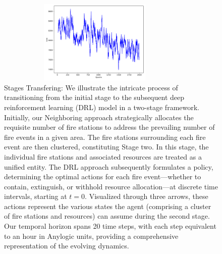 \documentclass[lettersize,journal]{IEEEtran}
\begin{document}
  

    \begin{figure}[H]
      \centering
      \includegraphics[height=4cm,width=9.5cm]{figs/manager_critic_loss.png}
      \caption{Stages Transfering: We illustrate the intricate process of transitioning from the initial stage to the subsequent deep reinforcement learning (DRL) model in a two-stage framework. Initially, our Neighboring approach strategically allocates the requisite number of fire stations to address the prevailing number of fire events in a given area. The fire stations surrounding each fire event are then clustered, constituting Stage two. In this stage, the individual fire stations and associated resources are treated as a unified entity. The DRL approach subsequently formulates a policy, determining the optimal actions for each fire event—whether to contain, extinguish, or withhold resource allocation—at discrete time intervals, starting at $t=0$. Visualized through three arrows, these actions represent the various states the agent (comprising a cluster of fire stations and resources) can assume during the second stage. Our temporal horizon spans 20 time steps, with each step equivalent to an hour in Anylogic units, providing a comprehensive representation of the evolving dynamics.}\end{figure}
    
    
    
\end{document}
